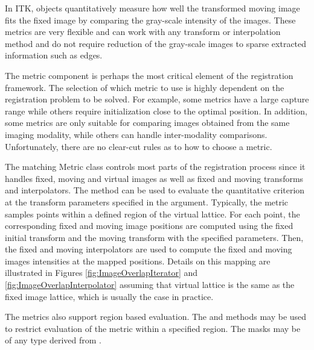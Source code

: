 %
%
%
%


In ITK,  objects quantitatively measure how well
the transformed moving image fits the fixed image by comparing the gray-scale
intensity of the images. These metrics are very flexible and can work with any
transform or interpolation method and do not require reduction of the
gray-scale images to sparse extracted information such as edges.

The metric component is perhaps the most critical element of the registration
framework. The selection of which metric to use is highly dependent on the
registration problem to be solved. For example, some metrics have a large
capture range while others require initialization close to the optimal
position.  In addition, some metrics are only suitable for comparing images
obtained from the same imaging modality, while others can handle
inter-modality comparisons.
Unfortunately, there are no clear-cut rules as to how to choose a metric.


The matching Metric class controls most parts of the registration process
since it handles fixed, moving and virtual images as well as fixed and moving
transforms and interpolators.  The method  can be used to
evaluate the quantitative criterion at the transform parameters specified in
the argument.  Typically, the metric samples points within a defined region
of the virtual lattice.  For each point, the corresponding fixed and moving
image positions are computed using the fixed initial transform and the moving
transform with the specified parameters. Then, the fixed and moving interpolators
are used to compute the fixed and moving images intensities at the mapped
positions. Details on this mapping are illustrated in Figures
\ref{fig:ImageOverlapIterator} and \ref{fig:ImageOverlapInterpolator} assuming
that virtual lattice is the same as the fixed image lattice, which is usually the
case in practice.

The metrics also support region based evaluation. The  and
 methods may be used to restrict evaluation of the metric
within a specified region. The masks may be of any type derived from .

